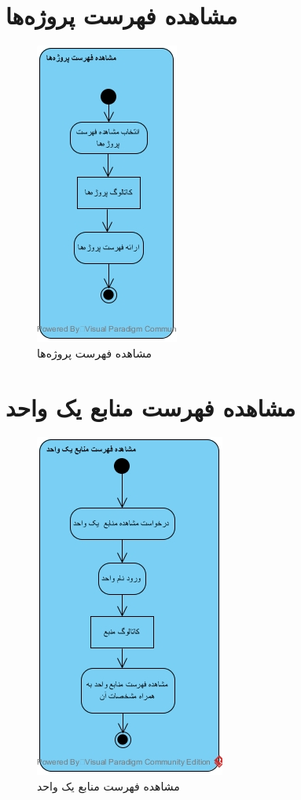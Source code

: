 \section{مشاهده فهرست پروژه‌ها}
\begin{figure}[H]
	\centering
	\includegraphics[scale=0.8]{img/activity/viewprjs}
	\caption{مشاهده فهرست پروژه‌ها}
\end{figure}


\section{مشاهده فهرست منابع یک واحد}
\begin{figure}[H]
	\centering
	\includegraphics[scale=0.8]{img/activity/viewresunit}
	\caption{مشاهده فهرست منابع یک واحد}
\end{figure}

